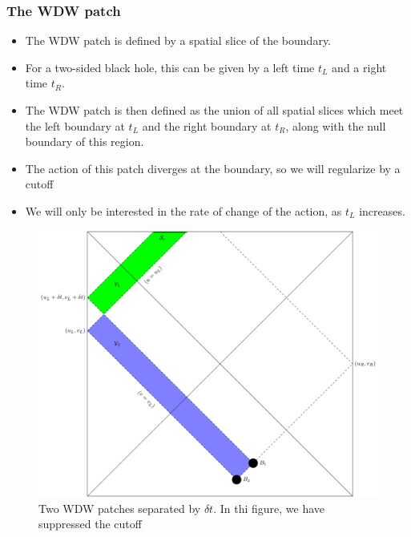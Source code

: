 \documentclass[8pt,aspectratio=169]{beamer}
\begin{document}
\begin{frame}
\frametitle{The WDW patch}

\begin{minipage}[t]{0.5\linewidth}

\begin{itemize}

\item The WDW patch is defined by a spatial slice of the boundary. 

\item For a two-sided black hole, this can be given by a left time $t_L$ and a right time $t_R$.

\item The WDW patch is then defined as the union of all spatial slices which meet the left boundary at $t_L$ and the right boundary at $t_R$, along with the null boundary of this region.

\item The action of this patch diverges at the boundary, so we will regularize by a cutoff

\item We will only be interested in the rate of change of the action, as $t_L$ increases.

\end{itemize}

\end{minipage}\hfill
%
\begin{minipage}[t]{0.48\linewidth}

\begin{figure}
    \begin{center}
    
        \includegraphics[scale=0.35]{2WDW.pdf}    
    
    \end{center}
    \caption{Two WDW patches separated by $\delta t$.  In thi figure, we have suppressed the cutoff}
    \label{fig:2WDW}
\end{figure}

\end{minipage}

\end{frame}
\end{document}
